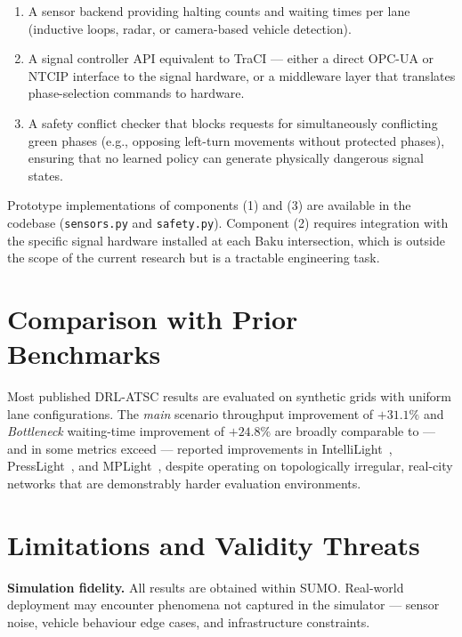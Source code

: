 \documentclass[12pt,oneside,a4paper]{report}
\begin{document}
\begin{enumerate}[leftmargin=*]
  \item A sensor backend providing halting counts and waiting
        times per lane (inductive loops, radar, or camera-based
        vehicle detection).

  \item A signal controller API equivalent to TraCI --- either a
        direct OPC-UA or NTCIP interface to the signal hardware,
        or a middleware layer that translates phase-selection
        commands to hardware.

  \item A safety conflict checker that blocks requests for
        simultaneously conflicting green phases (e.g., opposing
        left-turn movements without protected phases), ensuring
        that no learned policy can generate physically dangerous
        signal states.
\end{enumerate}

Prototype implementations of components (1) and (3) are available
in the codebase (\texttt{sensors.py} and \texttt{safety.py}).
Component (2) requires integration with the specific signal
hardware installed at each Baku intersection, which is outside the
scope of the current research but is a tractable engineering task.

\section{Comparison with Prior Benchmarks}
\label{sec:disc_compare}

Most published DRL-ATSC results are evaluated on synthetic grids
with uniform lane configurations.  The \textit{main} scenario
throughput improvement of $+31.1\%$ and \textit{Bottleneck}
waiting-time improvement of $+24.8\%$ are broadly comparable to
--- and in some metrics exceed --- reported improvements in
IntelliLight~\cite{intellilight2018}, PressLight~\cite{presslight2019},
and MPLight~\cite{mplight2020}, despite operating on topologically
irregular, real-city networks that are demonstrably harder
evaluation environments.

\section{Limitations and Validity Threats}
\label{sec:disc_limitations}

\textbf{Simulation fidelity.}
All results are obtained within SUMO.  Real-world deployment may
encounter phenomena not captured in the simulator --- sensor noise,
vehicle behaviour edge cases, and infrastructure constraints.
\end{document}
